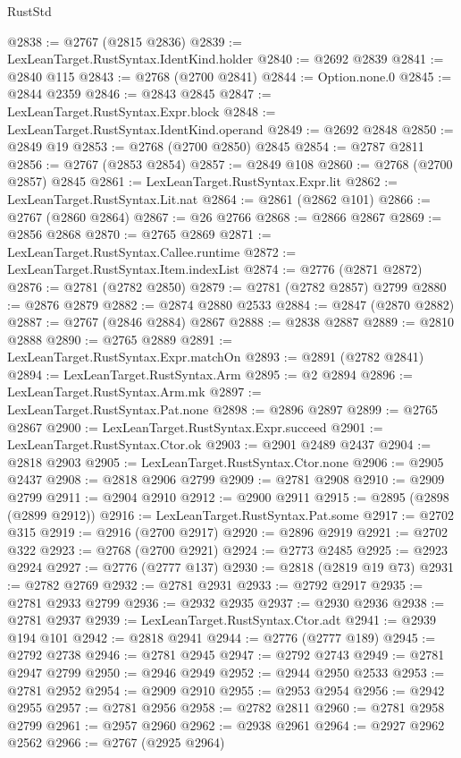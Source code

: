 \begin{lexlean}{RustStd}
\begin{coremodule}
@2838 := @2767 (@2815 @2836)
@2839 := LexLeanTarget.RustSyntax.IdentKind.holder
@2840 := @2692 @2839
@2841 := @2840 @115
@2843 := @2768 (@2700 @2841)
@2844 := Option.none.{0}
@2845 := @2844 @2359
@2846 := @2843 @2845
@2847 := LexLeanTarget.RustSyntax.Expr.block
@2848 := LexLeanTarget.RustSyntax.IdentKind.operand
@2849 := @2692 @2848
@2850 := @2849 @19
@2853 := @2768 (@2700 @2850) @2845
@2854 := @2787 @2811
@2856 := @2767 (@2853 @2854)
@2857 := @2849 @108
@2860 := @2768 (@2700 @2857) @2845
@2861 := LexLeanTarget.RustSyntax.Expr.lit
@2862 := LexLeanTarget.RustSyntax.Lit.nat
@2864 := @2861 (@2862 @101)
@2866 := @2767 (@2860 @2864)
@2867 := @26 @2766
@2868 := @2866 @2867
@2869 := @2856 @2868
@2870 := @2765 @2869
@2871 := LexLeanTarget.RustSyntax.Callee.runtime
@2872 := LexLeanTarget.RustSyntax.Item.indexList
@2874 := @2776 (@2871 @2872)
@2876 := @2781 (@2782 @2850)
@2879 := @2781 (@2782 @2857) @2799
@2880 := @2876 @2879
@2882 := @2874 @2880 @2533
@2884 := @2847 (@2870 @2882)
@2887 := @2767 (@2846 @2884) @2867
@2888 := @2838 @2887
@2889 := @2810 @2888
@2890 := @2765 @2889
@2891 := LexLeanTarget.RustSyntax.Expr.matchOn
@2893 := @2891 (@2782 @2841)
@2894 := LexLeanTarget.RustSyntax.Arm
@2895 := @2 @2894
@2896 := LexLeanTarget.RustSyntax.Arm.mk
@2897 := LexLeanTarget.RustSyntax.Pat.none
@2898 := @2896 @2897
@2899 := @2765 @2867
@2900 := LexLeanTarget.RustSyntax.Expr.succeed
@2901 := LexLeanTarget.RustSyntax.Ctor.ok
@2903 := @2901 @2489 @2437
@2904 := @2818 @2903
@2905 := LexLeanTarget.RustSyntax.Ctor.none
@2906 := @2905 @2437
@2908 := @2818 @2906 @2799
@2909 := @2781 @2908
@2910 := @2909 @2799
@2911 := @2904 @2910
@2912 := @2900 @2911
@2915 := @2895 (@2898 (@2899 @2912))
@2916 := LexLeanTarget.RustSyntax.Pat.some
@2917 := @2702 @315
@2919 := @2916 (@2700 @2917)
@2920 := @2896 @2919
@2921 := @2702 @322
@2923 := @2768 (@2700 @2921)
@2924 := @2773 @2485
@2925 := @2923 @2924
@2927 := @2776 (@2777 @137)
@2930 := @2818 (@2819 @19 @73)
@2931 := @2782 @2769
@2932 := @2781 @2931
@2933 := @2792 @2917
@2935 := @2781 @2933 @2799
@2936 := @2932 @2935
@2937 := @2930 @2936
@2938 := @2781 @2937
@2939 := LexLeanTarget.RustSyntax.Ctor.adt
@2941 := @2939 @194 @101
@2942 := @2818 @2941
@2944 := @2776 (@2777 @189)
@2945 := @2792 @2738
@2946 := @2781 @2945
@2947 := @2792 @2743
@2949 := @2781 @2947 @2799
@2950 := @2946 @2949
@2952 := @2944 @2950 @2533
@2953 := @2781 @2952
@2954 := @2909 @2910
@2955 := @2953 @2954
@2956 := @2942 @2955
@2957 := @2781 @2956
@2958 := @2782 @2811
@2960 := @2781 @2958 @2799
@2961 := @2957 @2960
@2962 := @2938 @2961
@2964 := @2927 @2962 @2562
@2966 := @2767 (@2925 @2964)

\end{coremodule}
\end{lexlean}
